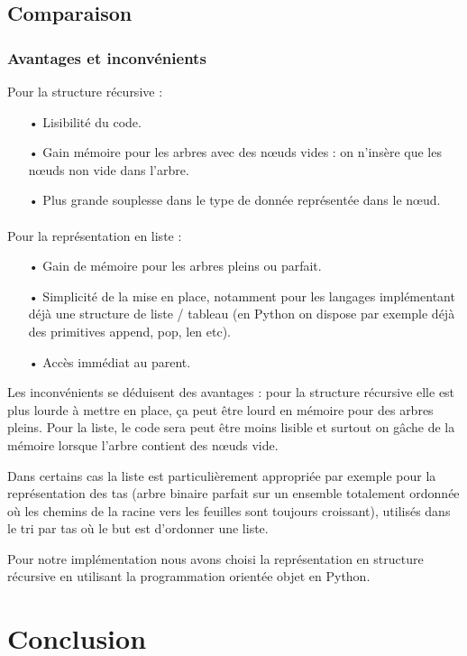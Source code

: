\documentclass{report}
\begin{document}
\subsection{Comparaison}
\subsubsection{Avantages et inconvénients}
Pour la structure récursive :
\begin{itemize}
\item[•]
Lisibilité du code.
\item[•]
Gain mémoire pour les arbres avec des nœuds vides : on n'insère que les nœuds non vide dans l'arbre.
\item[•]
Plus grande souplesse dans le type de donnée représentée dans le nœud.
\end{itemize}
\paragraph*{}
Pour la représentation en liste :
\begin{itemize}
\item[•]
Gain de mémoire pour les arbres pleins ou parfait.
\item[•]
Simplicité de la mise en place, notamment pour les langages implémentant déjà une structure de liste / tableau (en Python on dispose par exemple déjà des primitives append, pop, len etc).
\item[•]
Accès immédiat au parent.
\end{itemize}
Les inconvénients se déduisent des avantages : pour la structure récursive elle est plus lourde à mettre en place, ça peut être lourd en mémoire pour des arbres pleins.
Pour la liste, le code sera peut être moins lisible et surtout on gâche de la mémoire lorsque l'arbre contient des nœuds vide. 

Dans certains cas la liste est particulièrement appropriée par exemple pour la représentation des tas (arbre binaire parfait sur un ensemble totalement ordonnée où les chemins de la racine vers les feuilles sont toujours croissant), utilisés dans le tri par tas où le but est d'ordonner une liste. 

Pour notre implémentation nous avons choisi la représentation en structure récursive en utilisant la programmation orientée objet en Python.

\section{Conclusion}

\nocite{*}


\end{document}
